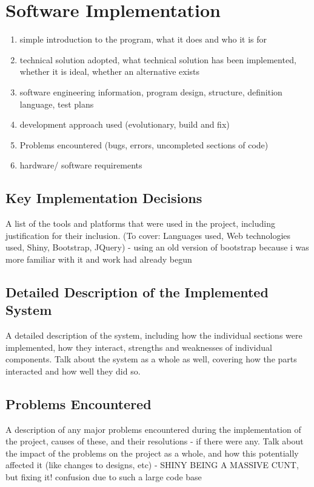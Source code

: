 \section{Software Implementation}

{\color{red}

\begin{enumerate}
\item simple introduction to the program, what it does and who it is for
\item technical solution adopted, what technical solution has been implemented, whether it is ideal, whether an alternative exists
\item software engineering information, program design, structure, definition language, test plans
\item development approach used (evolutionary, build and fix)
\item Problems encountered (bugs, errors, uncompleted sections of code)
\item hardware/ software requirements
\end{enumerate}

}

\subsection{Key Implementation Decisions}
\label{sec:kid}
{\color{red} A list of the tools and platforms that were used in the project, including justification for their inclusion. (To cover: Languages used, Web technologies used, Shiny, Bootstrap, JQuery) - using an old version of bootstrap because i was more familiar with it and work had already begun}


\subsection{Detailed Description of the Implemented System}
{\color{red} A detailed description of the system, including how the individual sections were implemented, how they interact, strengths and weaknesses of individual components. Talk about the system as a whole as well, covering how the parts interacted and how well they did so.}


\subsection{Problems Encountered}
{\color{red} 
A description of any major problems encountered during the implementation of the project, causes of these, and their resolutions - if there were any. Talk about the impact of the problems on the project as a whole, and how this potentially affected it (like changes to designs, etc) - SHINY BEING A MASSIVE CUNT, but fixing it! confusion due to such a large code base
}